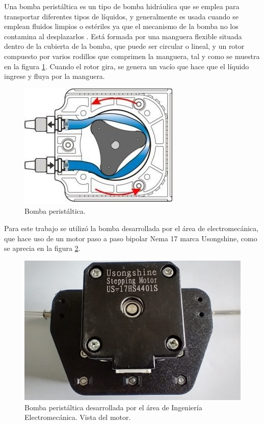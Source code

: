 Una bomba peristáltica es un tipo de bomba hidráulica que se emplea para transportar diferentes tipos de líquidos, y generalmente es usada cuando se emplean fluidos limpios o estériles ya que el mecanismo de la bomba no los contamina al desplazarlos \citep{ARTICLE:5}. Está formada por una manguera flexible situada dentro de la cubierta de la bomba, que puede ser circular o lineal, y un rotor compuesto por varios rodillos que comprimen la manguera, tal y como se muestra en la figura \ref{fig:bombaPeristEsq}. Cuando el rotor gira, se genera un vacío que hace que el líquido ingrese y fluya por la manguera.

\begin{figure}[htbp]
	\centering
	\includegraphics[width=.4\textwidth]{./Figures/bombaPeristEsq.png}
	\caption{Bomba peristáltica\protect\footnotemark.}
	\label{fig:bombaPeristEsq}
\end{figure}



Para este trabajo se utilizó la bomba desarrollada por el área de electromecánica, que hace uso de un motor paso a paso bipolar Nema 17 marca Usongshine, como se aprecia en la figura \ref{fig:bombaAtras}.

\begin{figure}[htbp]
	\centering
	\includegraphics[width=.5\textwidth]{./Figures/bombaAtras.jpeg}
	\caption{Bomba peristáltica desarrollada por el área de Ingeniería Electromecánica. Vista del motor.}
	\label{fig:bombaAtras}
\end{figure}

